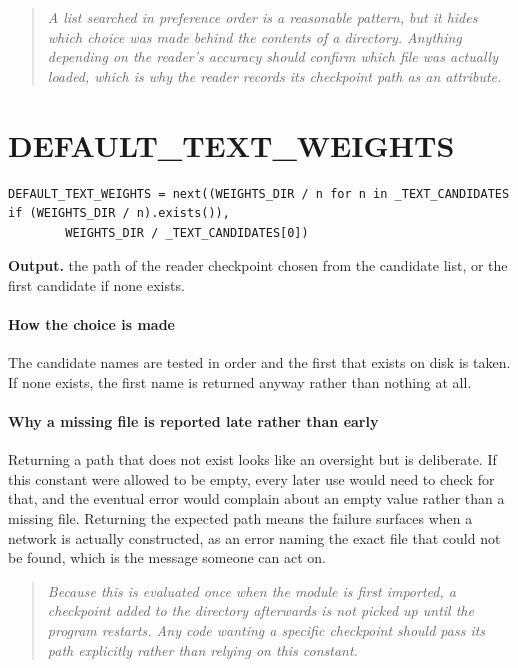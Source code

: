 \begin{quote}\small\itshape A list searched in preference order is a reasonable pattern, but it hides which choice was made behind the contents of a directory. Anything depending on the reader's accuracy should confirm which file was actually loaded, which is why the reader records its checkpoint path as an attribute.\end{quote}

\section{DEFAULT\_TEXT\_WEIGHTS}
\begin{lstlisting}[style=sig]
DEFAULT_TEXT_WEIGHTS = next((WEIGHTS_DIR / n for n in _TEXT_CANDIDATES if (WEIGHTS_DIR / n).exists()),
        WEIGHTS_DIR / _TEXT_CANDIDATES[0])
\end{lstlisting}

\noindent\textbf{Output.} the path of the reader checkpoint chosen from the candidate list, or the first candidate if none exists.


\paragraph{How the choice is made}
The candidate names are tested in order and the first that exists on disk is taken. If none exists, the first name is returned anyway rather than nothing at all.


\paragraph{Why a missing file is reported late rather than early}
Returning a path that does not exist looks like an oversight but is deliberate. If this constant were allowed to be empty, every later use would need to check for that, and the eventual error would complain about an empty value rather than a missing file. Returning the expected path means the failure surfaces when a network is actually constructed, as an error naming the exact file that could not be found, which is the message someone can act on.


\begin{quote}\small\itshape Because this is evaluated once when the module is first imported, a checkpoint added to the directory afterwards is not picked up until the program restarts. Any code wanting a specific checkpoint should pass its path explicitly rather than relying on this constant.\end{quote}

